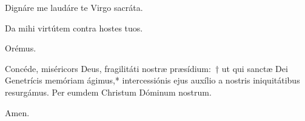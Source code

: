 \noindent \vv Dignáre me laudáre te Virgo sacráta.

\noindent \rr Da mihi virtútem contra hostes tuos.

Orémus.

\noindent Concéde, miséricors Deus, fragilitáti nostræ præsídium:~† ut qui sanctæ Dei Genetrícis memóriam ágimus,* intercessiónis ejus auxílio a nostris iniquitátibus resurgámus. Per eumdem Christum Dóminum nostrum.

\noindent \rr Amen.
